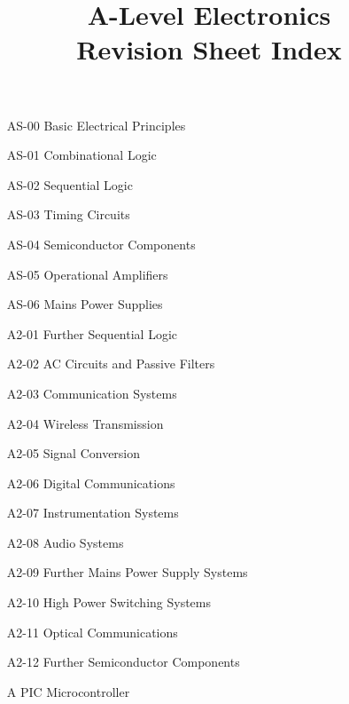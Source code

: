 \documentclass[a4paper,11pt, twocolumn]{article}
\title{\textbf{A-Level Electronics}\\ Revision Sheet Index}
\author{}
\date{}
\begin{document}
\maketitle
\thispagestyle{fancy}

\begin{enumerate}
    \item[AS-00] Basic Electrical Principles
    \item[AS-01] Combinational Logic
    \item[AS-02] Sequential Logic
    \item[AS-03] Timing Circuits
    \item[AS-04] Semiconductor Components
    \item[AS-05] Operational Amplifiers
    \item[AS-06] Mains Power Supplies
    \item[A2-01] Further Sequential Logic
    \item[A2-02] AC Circuits and Passive Filters
    \item[A2-03] Communication Systems
    \item[A2-04] Wireless Transmission
    \item[A2-05] Signal Conversion
    \item[A2-06] Digital Communications
    \item[A2-07] Instrumentation Systems
    \item[A2-08] Audio Systems
    \item[A2-09] Further Mains Power Supply Systems
    \item[A2-10] High Power Switching Systems
    \item[A2-11] Optical Communications
    \item[A2-12] Further Semiconductor Components
    \item[A] PIC Microcontroller
\end{enumerate}
\end{document}
